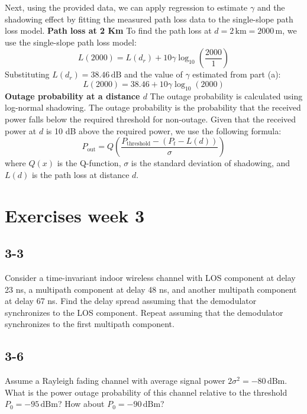 \documentclass[a4paper,12pt]{book}
\begin{document}
	Next, using the provided data, we can apply regression to estimate \( \gamma \) and the shadowing effect by fitting the measured path loss data to the single-slope path loss model.
	\newline\newline\noindent
	\textbf{Path loss at 2 Km}
	\newline
	To find the path loss at \( d = 2 \, \text{km} = 2000 \, \text{m} \), we use the single-slope path loss model:
	\[
	L(2000) = L(d_r) + 10 \gamma \log_{10} \left( \frac{2000}{1} \right)
	\]
	Substituting \( L(d_r) = 38.46 \, \text{dB} \) and the value of \( \gamma \) estimated from part (a):
	\[
	L(2000) = 38.46 + 10 \gamma \log_{10}(2000)
	\]
	\noindent
	\textbf{Outage probability at a distance \( d \)}
	\newline
	The outage probability is calculated using log-normal shadowing. The outage probability is the probability that the received power falls below the required threshold for non-outage. Given that the received power at \( d \) is 10 dB above the required power, we use the following formula:
	\[
	P_{\text{out}} = Q \left( \frac{P_{\text{threshold}} - (P_t - L(d))}{\sigma} \right)
	\]
	where \( Q(x) \) is the Q-function, \( \sigma \) is the standard deviation of shadowing, and \( L(d) \) is the path loss at distance \( d \).
	
	\section*{Exercises week 3}
	
	\subsection*{3-3}
	Consider a time-invariant indoor wireless channel with LOS component at delay 23 ns, a multipath component at delay 48 ns, and another multipath component at delay 67 ns. 
	Find the delay spread assuming that the demodulator synchronizes to the LOS component. Repeat assuming that the demodulator synchronizes to the first multipath component.
	
	\subsection*{3-6}
	Assume a Rayleigh fading channel with average signal power \( 2\sigma^2 = -80 \, \text{dBm} \). What is the power outage probability of this channel relative to the threshold \( P_0 = -95 \, \text{dBm} \)? How about \( P_0 = -90 \, \text{dBm} \)?
	
\end{document}
